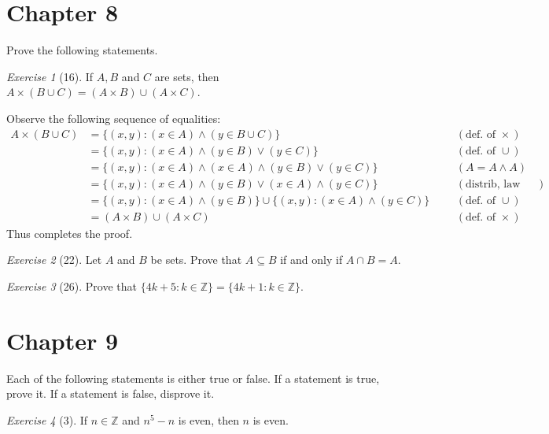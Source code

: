 \documentclass[12pt]{amsart}
\makeatletter
\theoremstyle{remark}
\newtheorem*{exercise}{Exercise}%
\def\ZZ{\ensuremath{\mathbb Z}}
\renewenvironment{proof}[1][\proofname]{\par\doublespacing
  \pushQED{\qed}%
  \normalfont \topsep6\p@\@plus6\p@\relax
  \list{}{%
    \settowidth{\leftmargin}{\itshape\proofname:\hskip\labelsep}%
    \setlength{\labelwidth}{0pt}%
    \setlength{\itemindent}{-\leftmargin}%
  }%
  \item[\hskip\labelsep\itshape#1\@addpunct{:}]\ignorespaces
}{%
  \popQED\endlist\@endpefalse
  \singlespacing
}
\theoremstyle{mycomment}
\makeatother
\begin{document}
\thispagestyle{fancy}

\section*{Chapter 8} Prove the following statements.
\begin{exercise}[16] If $A,B$ and $C$ are sets, then $A\times (B\cup C)=(A\times B)\cup (A\times C)$.
\begin{proof} Observe the following sequence of equalities:
  \begin{align*}
    A \times (B \cup C) & = \{(x,y):(x \in A) \land (y \in B \cup C)\} &&& (\text{def. of } \times)  \\
                        & = \{(x,y):(x \in A) \land (y \in B) \lor (y \in C)\} &&& (\text{def. of } \cup)\\
                        & = \{(x,y):(x \in A) \land (x \in A) \land ( y \in B) \lor (y \in C)\} &&& (A = A \land A) \\
                        & = \{(x,y):(x \in A) \land (y \in B) \lor (x \in A) \land (y \in C)\} &&&  (\text{distrib, law for sets})\\ %
                        & = \{(x,y):(x \in A) \land (y  \in B)\} \cup \{(x,y): (x \in A) \land (y \in C)\} &&& (\text{def. of } \cup)\\
                        & = (A \times B) \cup (A \times C) &&& (\text{def. of } \times)
  \end{align*}
  Thus completes the proof.
\end{proof}
\end{exercise}
\begin{exercise}[22] Let $A$ and $B$ be sets. Prove that $A\subseteq B$ if and only if $A\cap B=A$.
\begin{proof}%

\end{proof}
\end{exercise}

\begin{exercise}[26] Prove that $\{4k+5:k\in\ZZ\}=\{4k+1:k\in\ZZ\}$.
\begin{proof}%
\end{proof}
\end{exercise}
\section*{Chapter 9}

Each of the following statements is either true or false. If a statement is true, prove
it. If a statement is false, disprove it. 
\begin{exercise}[3] If $n\in \ZZ$ and $n^{5}-n$ is even, then $n$ is even.
\begin{proof}%
\end{proof}
\end{exercise}
\end{document}
